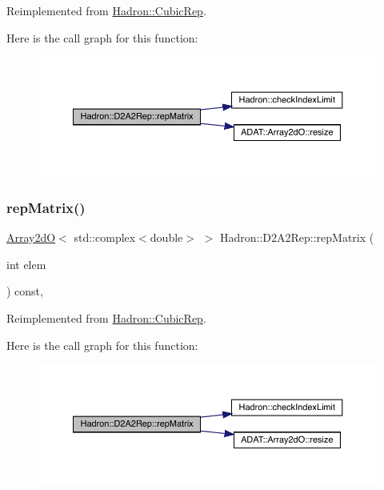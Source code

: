 Reimplemented from \mbox{\hyperlink{structHadron_1_1CubicRep_ac5d7e9e6f4ab1158b5fce3e4ad9e8005}{Hadron\+::\+Cubic\+Rep}}.

Here is the call graph for this function\+:
\nopagebreak
\begin{figure}[H]
\begin{center}
\leavevmode
\includegraphics[width=350pt]{d2/dfc/structHadron_1_1D2A2Rep_a75e7a00548888c39a9e3613c4b5178ef_cgraph}
\end{center}
\end{figure}
\mbox{\label{structHadron_1_1D2A2Rep_a75e7a00548888c39a9e3613c4b5178ef}} 
\subsubsection{\texorpdfstring{repMatrix()}{repMatrix()}\hspace{0.1cm}{\footnotesize\ttfamily [3/3]}}
{\footnotesize\ttfamily \mbox{\hyperlink{classADAT_1_1Array2dO}{Array2dO}}$<$ std\+::complex$<$double$>$ $>$ Hadron\+::\+D2\+A2\+Rep\+::rep\+Matrix (\begin{DoxyParamCaption}\item[{int}]{elem }\end{DoxyParamCaption}) const\hspace{0.3cm}{\ttfamily [inline]}, {\ttfamily [virtual]}}



Reimplemented from \mbox{\hyperlink{structHadron_1_1CubicRep_ac5d7e9e6f4ab1158b5fce3e4ad9e8005}{Hadron\+::\+Cubic\+Rep}}.

Here is the call graph for this function\+:
\nopagebreak
\begin{figure}[H]
\begin{center}
\leavevmode
\includegraphics[width=350pt]{d2/dfc/structHadron_1_1D2A2Rep_a75e7a00548888c39a9e3613c4b5178ef_cgraph}
\end{center}
\end{figure}


